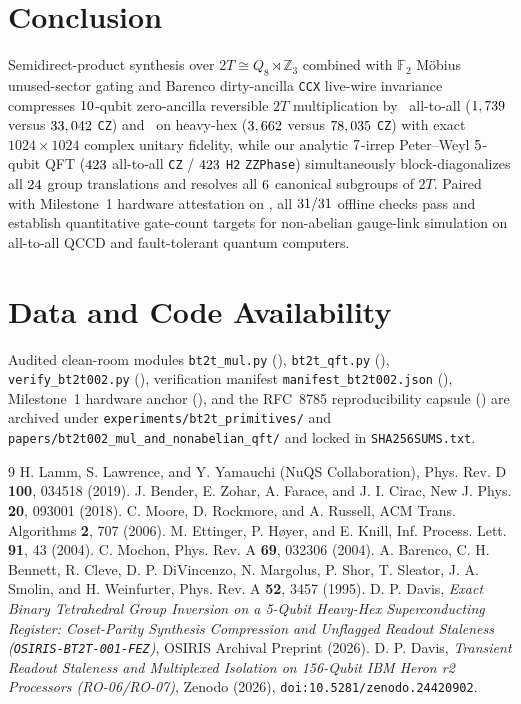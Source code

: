 \documentclass[aps,prx,twocolumn,superscriptaddress,nofootinbib]{revtex4-2}
\begin{document}
\section{Conclusion}
Semidirect-product synthesis over $2T \cong Q_8 \rtimes \mathbb{Z}_3$ combined with $\mathbb{F}_2$ M\"obius unused-sector gating and Barenco dirty-ancilla \texttt{CCX} live-wire invariance compresses $10$-qubit zero-ancilla reversible $2T$ multiplication by \btmMulAtaCzRatio\ all-to-all ($1,739$ versus $33,042$ \texttt{CZ}) and \btmMulHhCzRatio\ on heavy-hex ($3,662$ versus $78,035$ \texttt{CZ}) with exact $1024\times 1024$ complex unitary fidelity, while our analytic $7$-irrep Peter--Weyl $5$-qubit QFT ($423$ all-to-all \texttt{CZ} / $423$ \texttt{H2} \texttt{ZZPhase}) simultaneously block-diagonalizes all $24$ group translations and resolves all $6$ canonical subgroups of $2T$. Paired with Milestone~1 hardware attestation on \btmMoneBackend, all $31 / 31$ offline checks pass and establish quantitative gate-count targets for non-abelian gauge-link simulation on all-to-all QCCD and fault-tolerant quantum computers.

\section*{Data and Code Availability}
Audited clean-room modules \texttt{bt2t\_mul.py} (\btmMulPySha), \texttt{bt2t\_qft.py} (\btmQftPySha), \texttt{verify\_bt2t002.py} (\btmVerifyPySha), verification manifest \texttt{manifest\_bt2t002.json} (\btmManifestSha), Milestone~1 hardware anchor (\btmMoneResSha), and the RFC~8785 reproducibility capsule (\btmCapsuleSha) are archived under \texttt{experiments/bt2t\_primitives/} and \texttt{papers/bt2t002\_mul\_and\_nonabelian\_qft/} and locked in \texttt{SHA256SUMS.txt}.

\begin{thebibliography}{9}
 H. Lamm, S. Lawrence, and Y. Yamauchi (NuQS Collaboration), Phys. Rev. D \textbf{100}, 034518 (2019).
 J. Bender, E. Zohar, A. Farace, and J. I. Cirac, New J. Phys. \textbf{20}, 093001 (2018).
 C. Moore, D. Rockmore, and A. Russell, ACM Trans. Algorithms \textbf{2}, 707 (2006).
 M. Ettinger, P. H{\o}yer, and E. Knill, Inf. Process. Lett. \textbf{91}, 43 (2004).
 C. Mochon, Phys. Rev. A \textbf{69}, 032306 (2004).
 A. Barenco, C. H. Bennett, R. Cleve, D. P. DiVincenzo, N. Margolus, P. Shor, T. Sleator, J. A. Smolin, and H. Weinfurter, Phys. Rev. A \textbf{52}, 3457 (1995).
 D. P. Davis, \emph{Exact Binary Tetrahedral Group Inversion on a 5-Qubit Heavy-Hex Superconducting Register: Coset-Parity Synthesis Compression and Unflagged Readout Staleness (\texttt{OSIRIS-BT2T-001-FEZ})}, OSIRIS Archival Preprint (2026).
 D. P. Davis, \emph{Transient Readout Staleness and Multiplexed Isolation on 156-Qubit IBM Heron r2 Processors (RO-06/RO-07)}, Zenodo (2026), \texttt{doi:10.5281/zenodo.24420902}.
\end{thebibliography}
\end{document}
